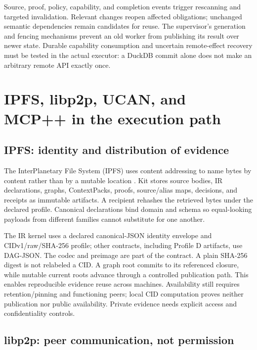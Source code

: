 \documentclass{article}
\begin{document}
Source, proof, policy, capability, and completion events trigger rescanning and targeted invalidation. Relevant changes reopen affected obligations; unchanged semantic dependencies remain candidates for reuse. The supervisor's generation and fencing mechanisms prevent an old worker from publishing its result over newer state. Durable capability consumption and uncertain remote-effect recovery must be tested in the actual executor: a DuckDB commit alone does not make an arbitrary remote API exactly once.

\section{IPFS, libp2p, UCAN, and MCP++ in the execution path}

\subsection{IPFS: identity and distribution of evidence}

The InterPlanetary File System (IPFS) uses content addressing to name bytes by content rather than by a mutable location \citep{ipfs}. Kit stores source bodies, IR declarations, graphs, ContextPacks, proofs, source/alias maps, decisions, and receipts as immutable artifacts. A recipient rehashes the retrieved bytes under the declared profile. Canonical declarations bind domain and schema so equal-looking payloads from different families cannot substitute for one another.

The IR kernel uses a declared canonical-JSON identity envelope and CIDv1/raw/SHA-256 profile; other contracts, including Profile D artifacts, use DAG-JSON. The codec and preimage are part of the contract. A plain SHA-256 digest is not relabeled a CID. A graph root commits to its referenced closure, while mutable current roots advance through a controlled publication path. This enables reproducible evidence reuse across machines. Availability still requires retention/pinning and functioning peers; local CID computation proves neither publication nor public availability. Private evidence needs explicit access and confidentiality controls.

\subsection{libp2p: peer communication, not permission}
\end{document}
